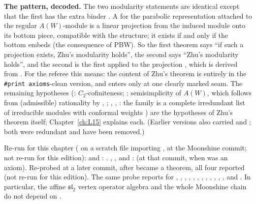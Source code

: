 \begin{dictionary}
\textbf{The pattern, decoded.} The two modularity statements are identical except that the first
has the extra binder . A  for the
parabolic representation attached to the regular $A(W)$-module is a linear projection from the
induced module onto its bottom piece, compatible with the structure; it exists if and only if the
bottom embeds (the  consequence of PBW). So the first theorem says ``if such a
projection exists, Zhu's modularity holds'', the second says ``Zhu's modularity holds'', and the
second is the first applied to the projection , which is derived
from . For the referee this means: the content of Zhu's theorem is entirely in the
\texttt{\#print axioms}-clean version, and  enters only at one clearly marked seam. The
remaining hypotheses (: $C_2$-cofiniteness; :
semisimplicity of $A(W)$, which follows from (admissible) rationality by
, ; , ,
: the family  is a complete irredundant list of irreducible modules with
conformal weights ) are the hypotheses of Zhu's theorem itself; Chapter~\ref{ch:L15}
explains each. (Earlier versions also carried  and ; both were redundant and have been removed.)
\end{dictionary}

\begin{status}
Re-run for this chapter ( on a scratch file
importing , at the Moonshine commit; not re-run for this edition):
 and : . ,
,  and
:  (at
that commit, when  was an axiom). Re-probed at a later commit, after  became a theorem, all four
reported  (not re-run for this edition).
The same probe reports  for
, , ,
, , ,
, ,
, ,
, ,
 and .
In particular, the affine $\mathfrak{sl}_2$ vertex operator algebra and the whole Moonshine chain
do not depend on .
\end{status}

